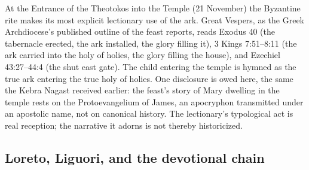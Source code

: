 At the Entrance of the Theotokos into the Temple (21 November) the Byzantine
rite makes its most explicit lectionary use of the ark. Great Vespers, as
the Greek Archdiocese's published outline of the feast reports, reads
Exodus 40 (the tabernacle erected, the ark installed, the glory filling it),
3 Kings 7:51--8:11 (the ark carried into the holy of holies, the glory
filling the house), and Ezechiel 43:27--44:4 (the shut east gate). The child
entering the temple is hymned as the true ark entering the true holy of
holies. One disclosure is owed here, the same the Kebra Nagast received
earlier: the feast's story of Mary dwelling in the temple rests
on the Protoevangelium of James, an apocryphon transmitted under an
apostolic name, not on canonical history. The lectionary's typological act
is real reception; the narrative it adorns is not thereby
historicized.

\subsection{Loreto, Liguori, and the devotional chain}


